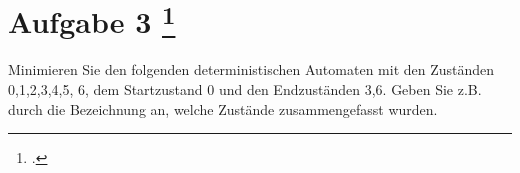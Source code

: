 \documentclass{lehramt-informatik-aufgabe}
\begin{document}
\section{Aufgabe 3
\footcite{66115:2013:09}}

Minimieren Sie den folgenden deterministischen Automaten mit den Zuständen
{0,1,2,3,4,5, 6}, dem Startzustand 0 und den Endzuständen {3,6}.
Geben Sie z.B. durch die Bezeichnung an, welche Zustände zusammengefasst wurden.
\end{document}
